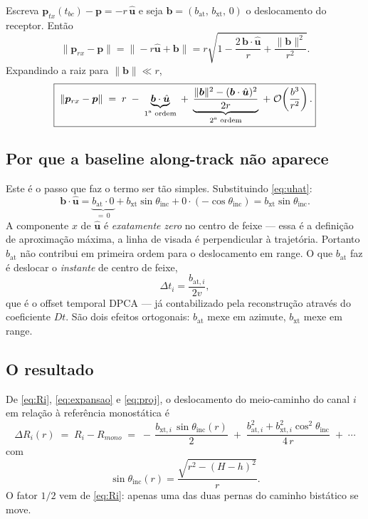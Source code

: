 \documentclass[11pt,a4paper]{article}
\newcommand{\bxt}{b_{\mathrm{xt}}}
\newcommand{\bat}{b_{\mathrm{at}}}
\newcommand{\thi}{\theta_{\mathrm{inc}}}
\newcommand{\uhat}{\hat{\bm{u}}}
\begin{document}
Escreva $\bm{p}_{tx}(t_{bc}) - \bm{p} = -r\,\uhat$ e seja
$\bm{b} = (\bat,\, \bxt,\, 0)$ o deslocamento do receptor. Então
\begin{equation}
\|\bm{p}_{rx}-\bm{p}\| = \bigl\| -r\uhat + \bm{b} \bigr\|
= r\sqrt{1 - \frac{2\,\bm{b}\cdot\uhat}{r} + \frac{\|\bm{b}\|^2}{r^2}}.
\end{equation}
Expandindo a raiz para $\|\bm{b}\| \ll r$,
\begin{equation}
\boxed{\;\|\bm{p}_{rx}-\bm{p}\| \;=\; r \;-\; \underbrace{\bm{b}\cdot\uhat}_{\text{1\textsuperscript{a} ordem}}
\;+\; \underbrace{\frac{\|\bm{b}\|^2 - (\bm{b}\cdot\uhat)^2}{2r}}_{\text{2\textsuperscript{a} ordem}}
\;+\; \mathcal{O}\!\left(\frac{b^3}{r^2}\right).}
\label{eq:expansao}
\end{equation}

\subsection{Por que a baseline along-track não aparece}

Este é o passo que faz o termo ser tão simples. Substituindo
\eqref{eq:uhat}:
\begin{equation}
\bm{b}\cdot\uhat
= \underbrace{\bat \cdot 0}_{=\,0} + \bxt\sin\thi + 0\cdot(-\cos\thi)
= \bxt \sin\thi .
\label{eq:proj}
\end{equation}
A componente $x$ de $\uhat$ é \emph{exatamente zero} no centro de feixe ---
essa é a definição de aproximação máxima, a linha de visada é perpendicular
à trajetória. Portanto $\bat$ não contribui em primeira ordem para o
deslocamento em range. O que $\bat$ faz é deslocar o \emph{instante} de
centro de feixe,
\begin{equation}
\Delta t_i = \frac{b_{\mathrm{at},i}}{2v},
\end{equation}
que é o offset temporal DPCA --- já contabilizado pela reconstrução através
do coeficiente $Dt$. São dois efeitos ortogonais: $\bat$ mexe em azimute,
$\bxt$ mexe em range.

\subsection{O resultado}

De \eqref{eq:Ri}, \eqref{eq:expansao} e \eqref{eq:proj}, o deslocamento do
meio-caminho do canal $i$ em relação à referência monostática é
\begin{equation}
\boxed{\;
\Delta R_i(r) \;=\; R_i - R_{mono}
\;=\; -\,\frac{b_{\mathrm{xt},i}\,\sin\thi(r)}{2}
\;+\; \frac{b_{\mathrm{at},i}^2 + b_{\mathrm{xt},i}^2\cos^2\thi}{4\,r}
\;+\;\cdots
\;}
\label{eq:dR}
\end{equation}
com
\begin{equation}
\sin\thi(r) = \frac{\sqrt{r^2 - (H-h)^2}}{r}.
\end{equation}
O fator $1/2$ vem de \eqref{eq:Ri}: apenas uma das duas pernas do caminho
bistático se move.
\end{document}
